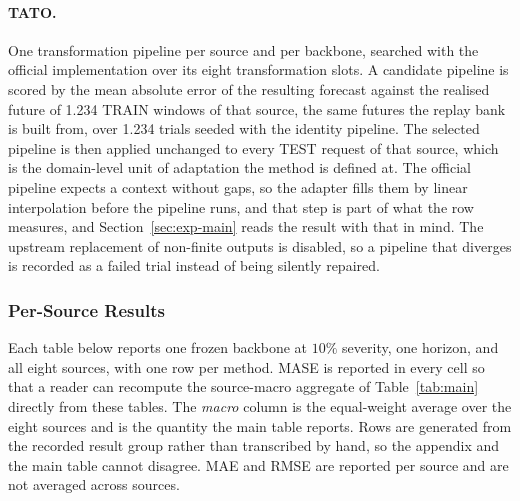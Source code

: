 \documentclass{article}
\begin{document}
\paragraph{TATO.} One transformation pipeline per source and per backbone, searched with the
official implementation over its eight transformation slots. A candidate pipeline is scored by
the mean absolute error of the resulting forecast against the realised future of
1.234 TRAIN windows of that source, the same futures the replay bank is built from,
over 1.234 trials seeded with the identity pipeline. The selected pipeline is then
applied unchanged to every TEST request of that source, which is the domain-level unit of
adaptation the method is defined at. The official pipeline expects a context without gaps, so
the adapter fills them by linear interpolation before the pipeline runs, and that step is
part of what the row measures, and Section~\ref{sec:exp-main} reads the result with that in
mind. The upstream replacement of non-finite outputs is disabled, so a pipeline that diverges
is recorded as a failed trial instead of being silently repaired.

\subsubsection{Per-Source Results}
\label{app:datasets}
Each table below reports one frozen backbone at $10\%$ severity, one horizon, and
all eight sources, with one row per method. MASE is reported in every cell so that a
reader can recompute the source-macro aggregate of Table~\ref{tab:main} directly from
these tables. The \emph{macro} column is the equal-weight average over the eight sources
and is the quantity the main table reports. Rows are generated from the recorded result
group rather than transcribed by hand, so the appendix and the main table cannot disagree.
MAE and RMSE are reported per source and are not averaged across sources.
\end{document}
